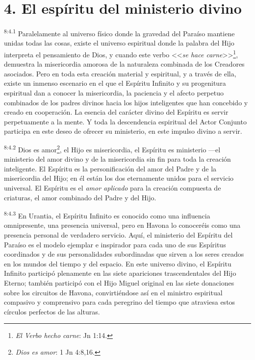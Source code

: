 \section*{4. El espíritu del ministerio divino}
\par
\textsuperscript{8:4.1} Paralelamente al universo físico donde la gravedad del Paraíso mantiene unidas todas las cosas, existe el universo espiritual donde la palabra del Hijo interpreta el pensamiento de Dios, y cuando este verbo <<\textit{se hace carne}>>\footnote{\textit{El Verbo hecho carne}: Jn 1:14.}, demuestra la misericordia amorosa de la naturaleza combinada de los Creadores asociados. Pero en toda esta creación material y espiritual, y a través de ella, existe un inmenso escenario en el que el Espíritu Infinito y su progenitura espiritual dan a conocer la misericordia, la paciencia y el afecto perpetuo combinados de los padres divinos hacia los hijos inteligentes que han concebido y creado en cooperación. La esencia del carácter divino del Espíritu es servir perpetuamente a la mente. Y toda la descendencia espiritual del Actor Conjunto participa en este deseo de ofrecer su ministerio, en este impulso divino a servir.

\par
\textsuperscript{8:4.2} Dios es amor\footnote{\textit{Dios es amor}: 1 Jn 4:8,16.}, el Hijo es misericordia, el Espíritu es ministerio ---el ministerio del amor divino y de la misericordia sin fin para toda la creación inteligente. El Espíritu es la personificación del amor del Padre y de la misericordia del Hijo; en él están los dos eternamente unidos para el servicio universal. El Espíritu es el \textit{amor aplicado} para la creación compuesta de criaturas, el amor combinado del Padre y del Hijo.

\par
\textsuperscript{8:4.3} En Urantia, el Espíritu Infinito es conocido como una influencia omnipresente, una presencia universal, pero en Havona lo conoceréis como una presencia personal de verdadero servicio. Aquí, el ministerio del Espíritu del Paraíso es el modelo ejemplar e inspirador para cada uno de sus Espíritus coordinados y de sus personalidades subordinadas que sirven a los seres creados en los mundos del tiempo y del espacio. En este universo divino, el Espíritu Infinito participó plenamente en las siete apariciones trascendentales del Hijo Eterno; también participó con el Hijo Miguel original en las siete donaciones sobre los circuitos de Havona, convirtiéndose así en el ministro espiritual compasivo y comprensivo para cada peregrino del tiempo que atraviesa estos círculos perfectos de las alturas.

